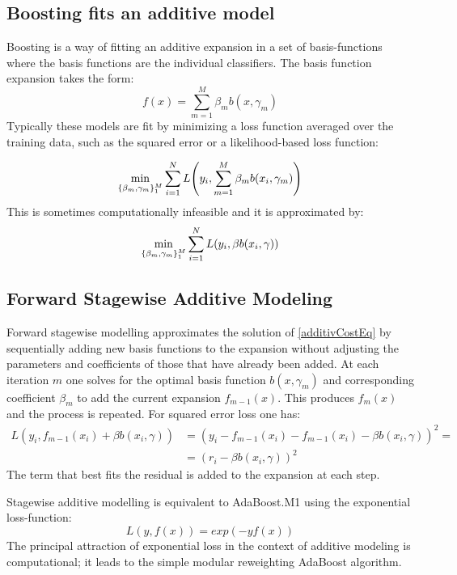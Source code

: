 \documentclass[12pt, letterpaper]{article}
\theoremstyle{definition}
\DeclarePairedDelimiter\autobracket{(}{)}
\newcommand{\br}[1]{\autobracket*{#1}}
\begin{document}
\subsection{Boosting fits an additive model}
Boosting is a way of fitting an additive expansion in a set of basis-functions where the basis functions are the individual classifiers. The basis function expansion takes the form:
\begin{equation}
f(x) = \sum_{m=1}^M \beta_m b(x, \gamma_m)
\end{equation}
Typically these models are fit by minimizing a loss function averaged over the training data, such as the squared error or a likelihood-based loss function:

\begin{equation}
\min_{\{\beta_m, \gamma_m\}_1^M} \sum_{i=1}^N L\br{y_i, \sum_{m=1}^M \beta_m b(x_i, \gamma_m)}
\label{additivCostEq}
\end{equation}
This is sometimes computationally infeasible and it is approximated by:
\begin{equation}
\min_{\{\beta_m, \gamma_m\}_1^M} \sum_{i=1}^N L\br{y_i, \beta b(x_i, \gamma)}
\end{equation}
\subsection{Forward Stagewise Additive Modeling}
Forward stagewise modelling approximates the solution of \autoref{additivCostEq} by sequentially adding new basis functions to the expansion without adjusting the parameters and coefficients of those that have already been added. At each iteration $m$ one solves for the optimal basis function $b(x, \gamma_m)$ and corresponding coefficient $\beta_m$ to add the current expansion $f_{m-1}(x)$. This produces $f_m(x)$ and the process is repeated. For squared error loss one has:
\begin{equation}
\begin{aligned}
L(y_i, f_{m-1}(x_i)+\beta b(x_i, \gamma)) &= (y_i-f_{m-1}(x_i)-f_{m-1}(x_i)-\beta b(x_i, \gamma))^2 =\\
 &=(r_i-\beta b(x_i, \gamma))^2
\end{aligned}
\end{equation}
The term that best fits the residual is added to the expansion at each step.

Stagewise additive modelling is equivalent to AdaBoost.M1 using the exponential loss-function:
\begin{equation}
L(y, f(x))  = exp(-yf(x))
\end{equation}
The principal attraction of exponential loss in the context of additive modeling is computational; it leads to the simple modular reweighting AdaBoost algorithm.
\end{document}
